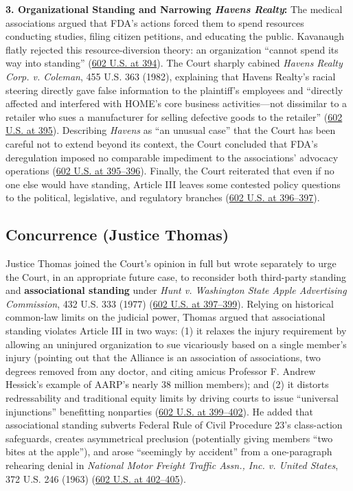 \documentclass[12pt]{article}
\begin{document}
\textbf{3. Organizational Standing and Narrowing \textit{Havens Realty}:} The medical associations argued that FDA's actions forced them to spend resources conducting studies, filing citizen petitions, and educating the public. Kavanaugh flatly rejected this resource-diversion theory: an organization ``cannot spend its way into standing'' (\href{https://www.supremecourt.gov/opinions/23pdf/602us1r35_bqmd.pdf}{602 U.S. at 394}). The Court sharply cabined \textit{Havens Realty Corp. v. Coleman}, 455 U.S. 363 (1982), explaining that Havens Realty's racial steering directly gave false information to the plaintiff's employees and ``directly affected and interfered with HOME's core business activities---not dissimilar to a retailer who sues a manufacturer for selling defective goods to the retailer'' (\href{https://www.supremecourt.gov/opinions/23pdf/602us1r35_bqmd.pdf}{602 U.S. at 395}). Describing \textit{Havens} as ``an unusual case'' that the Court has been careful not to extend beyond its context, the Court concluded that FDA's deregulation imposed no comparable impediment to the associations' advocacy operations (\href{https://www.supremecourt.gov/opinions/23pdf/602us1r35_bqmd.pdf}{602 U.S. at 395--396}). Finally, the Court reiterated that even if no one else would have standing, Article III leaves some contested policy questions to the political, legislative, and regulatory branches (\href{https://www.supremecourt.gov/opinions/23pdf/602us1r35_bqmd.pdf}{602 U.S. at 396--397}).

\subsection{Concurrence (Justice Thomas)}

Justice Thomas joined the Court's opinion in full but wrote separately to urge the Court, in an appropriate future case, to reconsider both third-party standing and \textbf{associational standing} under \textit{Hunt v. Washington State Apple Advertising Commission}, 432 U.S. 333 (1977) (\href{https://www.supremecourt.gov/opinions/23pdf/602us1r35_bqmd.pdf}{602 U.S. at 397--399}). Relying on historical common-law limits on the judicial power, Thomas argued that associational standing violates Article III in two ways: (1) it relaxes the injury requirement by allowing an uninjured organization to sue vicariously based on a single member's injury (pointing out that the Alliance is an association of associations, two degrees removed from any doctor, and citing amicus Professor F. Andrew Hessick's example of AARP's nearly 38 million members); and (2) it distorts redressability and traditional equity limits by driving courts to issue ``universal injunctions'' benefitting nonparties (\href{https://www.supremecourt.gov/opinions/23pdf/602us1r35_bqmd.pdf}{602 U.S. at 399--402}). He added that associational standing subverts Federal Rule of Civil Procedure 23's class-action safeguards, creates asymmetrical preclusion (potentially giving members ``two bites at the apple''), and arose ``seemingly by accident'' from a one-paragraph rehearing denial in \textit{National Motor Freight Traffic Assn., Inc. v. United States}, 372 U.S. 246 (1963) (\href{https://www.supremecourt.gov/opinions/23pdf/602us1r35_bqmd.pdf}{602 U.S. at 402--405}).
\end{document}
